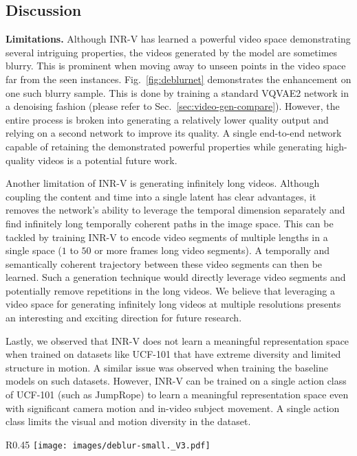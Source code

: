\documentclass[10pt]{article} \usepackage[accepted]{tmlr}
\begin{document}
\subsection{Discussion}

\textbf{Limitations. }Although INR-V has learned a powerful video space demonstrating several intriguing properties, the videos generated by the model are sometimes blurry. This is prominent when moving away to unseen points in the video space far from the seen instances. Fig.~\ref{fig:deblurnet} demonstrates the enhancement on one such blurry sample. This is done by training a standard VQVAE2 network in a denoising fashion (please refer to Sec.~\ref{sec:video-gen-compare}). However, the entire process is broken into generating a relatively lower quality output and relying on a second network to improve its quality. A single end-to-end network capable of retaining the demonstrated powerful properties while generating high-quality videos is a potential future work.

Another limitation of INR-V is generating infinitely long videos. Although coupling the content and time into a single latent has clear advantages, it removes the network's ability to leverage the temporal dimension separately and find infinitely long temporally coherent paths in the image space. This can be tackled by training INR-V to encode video segments of multiple lengths in a single space  ($1$ to $50$ or more frames long video segments). A temporally and semantically coherent trajectory between these video segments can then be learned. Such a generation technique would directly leverage video segments and potentially remove repetitions in the long videos. We believe that leveraging a video space for generating infinitely long videos at multiple resolutions presents an interesting and exciting direction for future research.

Lastly, we observed that INR-V does not learn a meaningful representation space when trained on datasets like UCF-101 that have extreme diversity and limited structure in motion. A similar issue was observed when training the baseline models on such datasets.
However, INR-V can be trained on a single action class of UCF-101 (such as JumpRope) to learn a meaningful representation space even with significant camera motion and in-video subject movement. A single action class limits the visual and motion diversity in the dataset. 



\begin{wrapfigure}[]{R}{0.45\textwidth}
    \centering
    \vspace{-10pt}
    \texttt{[image: images/deblur-small.\_V3.pdf]}
    \caption{\small Denoising VQVAE2 reconstructions to enhance the visual quality of relatively blurry videos generated by INR-V. 
    Please refer Sec.~\ref{sec:video-gen-compare}.}
    \label{fig:deblurnet}
  
\end{wrapfigure}
\end{document}
